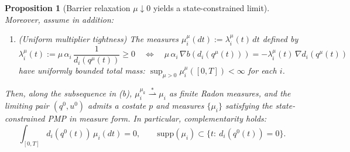 \documentclass{article} %
\newtheorem{proposition}[theorem]{Proposition}
\begin{document}
\begin{proposition}[Barrier relaxation $\mu\downarrow 0$ yields a state-constrained limit]
Moreover, assume in addition:
\begin{enumerate}[(H5)]
\item (\emph{Uniform multiplier tightness}) The measures $\mu_i^\mu(dt):=\lambda_i^\mu(t)\,dt$ defined by
\begin{equation}
\label{eq:lambda_def}
\lambda_i^\mu(t):=\mu\,\alpha_i\,\frac{1}{d_i(q^\mu(t))}\ge 0
\quad\Longleftrightarrow\quad
\mu\,\alpha_i\,\nabla b(d_i(q^\mu(t))) = -\lambda_i^\mu(t)\,\nabla d_i(q^\mu(t))
\end{equation}
have uniformly bounded total mass:
$\sup_{\mu>0}\mu_i^\mu([0,T])<\infty$ for each $i$.
\end{enumerate}
Then, along the subsequence in (b), $\mu_i^{\mu_k}\overset{\ast}{\rightharpoonup} \mu_i$ as finite Radon measures,
and the limiting pair $(q^0,u^0)$ admits a costate $p$ and measures $\{\mu_i\}$ satisfying the state-constrained PMP in measure form.
In particular, complementarity holds:
\begin{equation}
\label{eq:measure_complementarity_limit}
\int_{[0,T]} d_i(q^0(t))\,\mu_i(dt)=0,\qquad \mathrm{supp}(\mu_i)\subset\{t:\ d_i(q^0(t))=0\}.
\end{equation}
\end{proposition}
\end{document}
